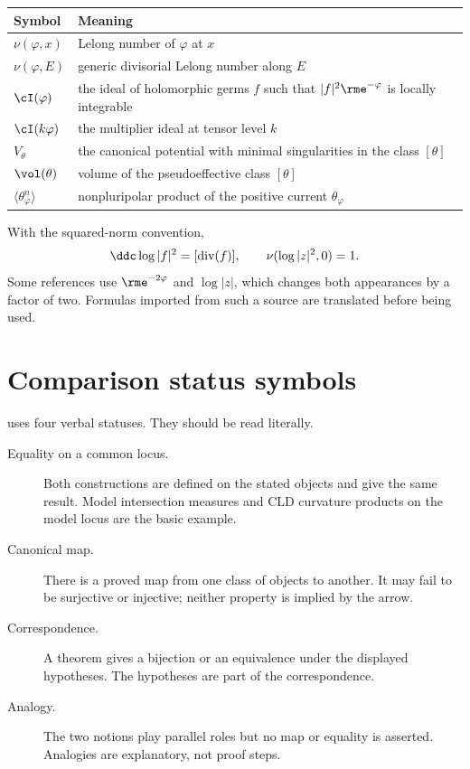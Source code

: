 \begin{center}
\begin{tabular}{@{}p{}p{}@{}}
\toprule
Symbol & Meaning \\
\midrule
\(\nu(\varphi,x)\)
  & Lelong number of \(\varphi\) at \(x\) \\
\(\nu(\varphi,E)\)
  & generic divisorial Lelong number along \(E\) \\
\(\cI(\varphi)\)
  & the ideal of holomorphic germs \(f\) such that
    \(|f|^2\rme^{-\varphi}\) is locally integrable \\
\(\cI(k\varphi)\)
  & the multiplier ideal at tensor level \(k\) \\
\(V_\theta\)
  & the canonical potential with minimal singularities in the class
    \([\theta]\) \\
\(\vol(\theta)\)
  & volume of the pseudoeffective class \([\theta]\) \\
\(\langle\theta_\varphi^n\rangle\)
  & nonpluripolar product of the positive current
    \(\theta_\varphi\) \\
\bottomrule
\end{tabular}
\end{center}

With the squared-norm convention,
\[
 \ddc\log|f|^2=[\operatorname{div}(f)],
 \qquad
 \nu(\log|z|^2,0)=1.
\]
Some references use \(\rme^{-2\varphi}\) and \(\log|z|\), which changes both
appearances by a factor of two.  Formulas imported from such a source are
translated before being used.

\section{Comparison status symbols}
\label{sec:appK-status}


 uses four verbal statuses.  They should be read literally.

\begin{description}
\item[Equality on a common locus.]
Both constructions are defined on the stated objects and give the same
result.  Model intersection measures and CLD curvature products on the
model locus are the basic example.

\item[Canonical map.]
There is a proved map from one class of objects to another.  It may fail to
be surjective or injective; neither property is implied by the arrow.

\item[Correspondence.]
A theorem gives a bijection or an equivalence under the displayed
hypotheses.  The hypotheses are part of the correspondence.

\item[Analogy.]
The two notions play parallel roles but no map or equality is asserted.
Analogies are explanatory, not proof steps.
\end{description}

